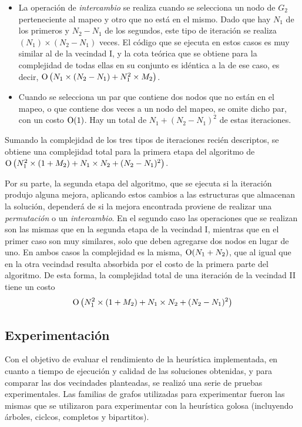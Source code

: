 \begin{itemize}
    \item La operación de \emph{intercambio} se realiza cuando se selecciona
    un nodo de $G_2$ perteneciente al mapeo y otro que no está en el mismo.
    Dado que hay $N_1$ de los primeros y $N_2 - N_1$ de los
    segundos, este tipo de iteración se realiza $(N_1) \times (N_2 - N_1)$
    veces. El código que se ejecuta en estos casos es muy similar al de la
    vecindad I, y la cota teórica que se obtiene para la complejidad de todas
    ellas en su conjunto es idéntica a la de ese caso, es decir,
    $\operatorname{O} \left( N_1 \times (N_2 - N_1) + N_1^2 \times M_2 \right)$.

    \item Cuando se selecciona un par que contiene dos nodos que no están en
    el mapeo, o que contiene dos veces a un nodo del mapeo, se omite dicho
    par, con un costo $\operatorname{O}(1)$. Hay un total de $N_1 + (N_2 - N_1)^2$ de
    estas iteraciones.
\end{itemize}

Sumando la complejidad de los tres tipos de iteraciones recién descriptos, se
obtiene una complejidad total para la primera etapa del algoritmo de
$\operatorname{O} \left( N_1^2 \times (1 + M_2) + N_1 \times N_2 + (N_2 - N_1)^2 \right)$.

Por su parte, la segunda etapa del algoritmo, que se ejecuta si la
iteración produjo alguna mejora, aplicando estos cambios a las estructuras
que almacenan la solución, dependerá de si la mejora encontrada proviene de
realizar una \emph{permutación} o un \emph{intercambio}. En el segundo
caso las operaciones que se realizan son las mismas que en la segunda etapa
de la vecindad I, mientras que en el primer caso son muy similares, solo que
deben agregarse dos nodos en lugar de uno. En ambos casos la complejidad es la
misma, $\operatorname{O} (N_1 + N_2)$, que al igual que en la otra vecindad resulta
absorbida por el costo de la primera parte del algoritmo. De esta forma, la
complejidad total de una iteración de la vecindad II tiene un costo
\[
\operatorname{O} \left( N_1^2 \times (1 + M_2) + N_1 \times N_2 + (N_2 - N_1)^2 \right)
\]


\subsection{Experimentación}

Con el objetivo de evaluar el rendimiento de la heurística implementada, en
cuanto a tiempo de ejecución y calidad de las soluciones obtenidas, y para
comparar las dos vecindades planteadas, se realizó una serie de pruebas
experimentales. Las familias de grafos utilizadas para experimentar fueron las
mismas que se utilizaron para experimentar con la heurística golosa
(incluyendo árboles, ciclcos, completos y bipartitos).

